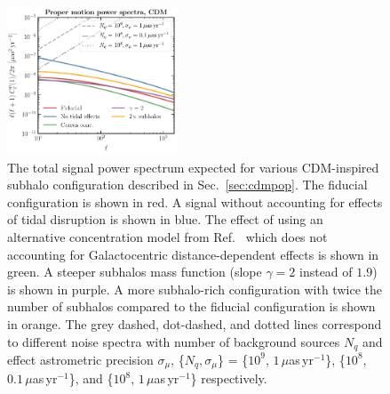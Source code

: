 \documentclass[prd,aps,twocolumn,nofootinbib,superscriptaddress,preprintnumbers,balancelastpage,longbibliography,floatfix]{revtex4-1}
\begin{document}
\begin{figure}[htbp]
\centering
\includegraphics[width=0.45\textwidth]{plots/LCDMTheoryNoise.pdf}
\caption{The total signal power spectrum expected for various CDM-inspired subhalo configuration described in Sec.~\ref{sec:cdmpop}. The fiducial configuration is shown in red. A signal without accounting for effects of tidal disruption is shown in blue. The effect of using an alternative concentration model from Ref.~\cite{Correa:2015dva} which does not accounting for Galactocentric distance-dependent effects is shown in green. A steeper subhalos mass function (slope $\gamma = 2$ instead of $1.9$) is shown in purple. A  more subhalo-rich configuration with twice the number of subhalos compared to the fiducial configuration is shown in orange. The grey dashed, dot-dashed, and dotted lines correspond to different noise spectra with number of background sources $N_q$ and effect astrometric precision $\sigma_\mu$, \{$N_q , \sigma_\mu$\} =  \{$10^9$, $1\,\mu$as\,yr$^{-1}$\}, \{$10^8$, $0.1\,\mu$as\,yr$^{-1}$\}, and \{$10^8$, $1\,\mu$as\,yr$^{-1}$\} respectively. } 
\label{fig:lcdm_theory}
\end{figure}
\end{document}
